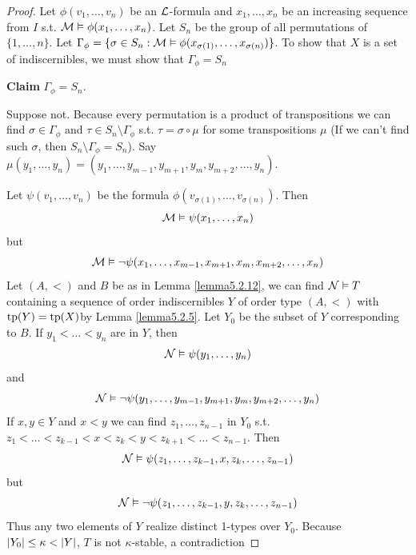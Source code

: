 \documentclass[11pt]{article}
\begin{document}
\begin{proof}
Let \(\phi(v_1,\dots,v_n)\) be an \(\mathcal{L}\)-formula and \(x_1,\dots,x_n\) be an increasing sequence from \(I\)
s.t. \(\mathcal{M}\vDash\phi(x_1,\dots,x_n)\). Let \(S_n\) be the group of all permutations of \(\{1,\dots,n\}\).
Let \(\Gamma_\phi=\{\sigma\in  S_n:\mathcal{M}\vDash\phi(x_{\sigma(1)},\dots,x_{\sigma(n)})\}\). To show that \(X\) is a set of indiscernibles, we
must show that \(\Gamma_\phi=S_n\)

\textbf{Claim} \(\Gamma_\phi=S_n\).

Suppose not. Because every permutation is a product of transpositions we can find \(\sigma\in\Gamma_\phi\)
and \(\tau\in S_n\setminus\Gamma_\phi\) s.t. \(\tau=\sigma\circ\mu\) for some transpositions \(\mu\) (If we can't find such \(\sigma\), then \(S_n\setminus\Gamma_\phi=S_n\)). Say
\(\mu(y_1,\dots,y_n)=(y_1,\dots,y_{m-1},y_{m+1},y_m,y_{m+2},\dots,y_n)\).

Let \(\psi(v_1,\dots,v_n)\) be the formula \(\phi(v_{\sigma(1)},\dots,v_{\sigma(n)})\). Then
\begin{equation*}
\mathcal{M}\vDash\psi(x_1,\dots,x_n)
\end{equation*}
but
\begin{equation*}
\mathcal{M}\vDash\neg\psi(x_1,\dots,x_{m-1},x_{m+1},x_m,x_{m+2},\dots,x_n)
\end{equation*}
Let \((A,<)\) and \(B\) be as in Lemma \ref{lemma5.2.12}, we can find \(\mathcal{N}\vDash T\)  containing a
sequence of order indiscernibles \(Y\) of order type \((A,<)\)
with \(\operatorname{tp}(Y)=\operatorname{tp}(X)\)by Lemma \ref{lemma5.2.5}.
Let \(Y_0\) be the subset of \(Y\) corresponding to \(B\). If \(y_1<\dots<y_n\) are in \(Y\), then
\begin{equation*}
\mathcal{N}\vDash\psi(y_1,\dots,y_n)
\end{equation*}
and
\begin{equation*}
\mathcal{N}\vDash\neg\psi(y_1,\dots,y_{m-1},y_{m+1},y_m,y_{m+2},\dots,y_n)
\end{equation*}
If \(x,y\in Y\) and \(x<y\) we can find \(z_1,\dots,z_{n-1}\) in \(Y_0\)
s.t. \(z_1<\dots<z_{k-1}<x<z_k<y<z_{k+1}<\dots<z_{n-1}\). Then
\begin{equation*}
\mathcal{N}\vDash\psi(z_1,\dots,z_{k-1},x,z_k,\dots,z_{n-1})
\end{equation*}
but
\begin{equation*}
\mathcal{N}\vDash\neg\psi(z_1,\dots,z_{k-1},y,z_k,\dots,z_{n-1})
\end{equation*}
Thus any two elements of \(Y\) realize distinct 1-types over \(Y_0\).
Because \(\abs{Y_0}\le\kappa<\abs{Y}\), \(T\) is not \(\kappa\)-stable, a contradiction
\end{proof}
\end{document}
